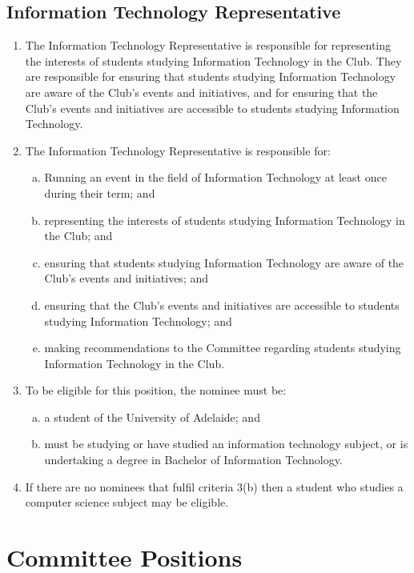 \documentclass{schedule}
\begin{document}
\subsection{Information Technology Representative}
\begin{enumerate}[(1)]
    \item The Information Technology Representative is responsible for representing the interests of students studying Information Technology in the Club. They are responsible for ensuring that students studying Information Technology are aware of the Club's events and initiatives, and for ensuring that the Club's events and initiatives are accessible to students studying Information Technology.
    \item The Information Technology Representative is responsible for:
          \begin{enumerate}[(a)]
              \item Running an event in the field of Information Technology at least once during their term; and
              \item representing the interests of students studying Information Technology in the Club; and
              \item ensuring that students studying Information Technology are aware of the Club's events and initiatives; and
              \item ensuring that the Club's events and initiatives are accessible to students studying Information Technology; and
              \item making recommendations to the Committee regarding students studying Information Technology in the Club.
          \end{enumerate}
    \item To be eligible for this position, the nominee must be:
          \begin{enumerate}[(a)]
              \item a student of the University of Adelaide; and
              \item must be studying or have studied an information technology subject, or is undertaking a degree in Bachelor of Information Technology.
          \end{enumerate}
    \item If there are no nominees that fulfil criteria 3(b) then a student who studies a computer science subject may be eligible.
\end{enumerate}


\section{Committee Positions}
\end{document}
